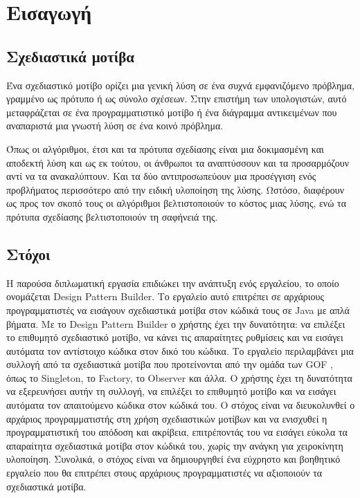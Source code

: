 \chapter{Εισαγωγή}
\label{ch:Introduction}
\section{Σχεδιαστικά μοτίβα}
\label{sec:patterns}
Ένα σχεδιαστικό μοτίβο \cite{GoF} ορίζει μια γενική λύση σε ένα συχνά εμφανιζόμενο πρόβλημα, γραμμένο
ως πρότυπο ή ως σύνολο σχέσεων. Στην επιστήμη των υπολογιστών, αυτό μεταφράζεται σε ένα
προγραμματιστικό μοτίβο ή ένα διάγραμμα αντικειμένων που αναπαριστά μια 
γνωστή λύση σε ένα κοινό πρόβλημα. \par
Όπως οι αλγόριθμοι, έτσι και τα πρότυπα σχεδίασης είναι μια δοκιμασμένη
και αποδεκτή λύση και ως εκ τούτου, οι άνθρωποι τα αναπτύσσουν και 
τα προσαρμόζουν αντί να τα ανακαλύπτουν.
Και τα δύο αντιπροσωπεύουν μια προσέγγιση ενός προβλήματος περισσότερο από 
την ειδική υλοποίηση της λύσης. Ωστόσο, διαφέρουν ως προς τον σκοπό τους 
οι αλγόριθμοι βελτιστοποιούν το κόστος μιας λύσης, 
ενώ τα πρότυπα σχεδίασης βελτιστοποιούν τη σαφήνειά της.
\section{Στόχοι}
\label{sec:Objectives}
Η παρούσα διπλωματική εργασία επιδιώκει την ανάπτυξη ενός εργαλείου, το οποίο ονομάζεται Design Pattern Builder. 
Το εργαλείο αυτό επιτρέπει σε αρχάριους προγραμματιστές να εισάγουν 
σχεδιαστικά μοτίβα στον κώδικά τους σε Java με απλά βήματα. 
Με το Design Pattern Builder ο χρήστης έχει την δυνατότητα: να επιλέξει το επιθυμητό 
σχεδιαστικό μοτίβο, να κάνει τις απαραίτητες ρυθμίσεις 
και να εισάγει αυτόματα τον αντίστοιχο κώδικα στον δικό του κώδικα. 
Το εργαλείο περιλαμβάνει μια συλλογή από τα σχεδιαστικά μοτίβα που 
προτείνονται από την ομάδα των GOF \cite{GoF}, 
όπως το Singleton, το Factory, το Observer και άλλα. 
Ο χρήστης έχει τη δυνατότητα να εξερευνήσει αυτήν τη συλλογή, να επιλέξει 
το επιθυμητό μοτίβο και να εισάγει αυτόματα τον απαιτούμενο κώδικα στον κώδικά 
του. Ο στόχος είναι να διευκολυνθεί ο αρχάριος προγραμματιστής στη χρήση 
σχεδιαστικών μοτίβων και να ενισχυθεί η προγραμματιστική του απόδοση και ακρίβεια, 
επιτρέποντάς του να εισάγει εύκολα τα απαραίτητα σχεδιαστικά μοτίβα στον κώδικά 
του, χωρίς την ανάγκη για χειροκίνητη υλοποίηση. 
Συνολικά, ο στόχος είναι να δημιουργηθεί ένα εύχρηστο και βοηθητικό 
εργαλείο που θα επιτρέπει στους αρχάριους προγραμματιστές να αξιοποιούν 
τα σχεδιαστικά μοτίβα.
